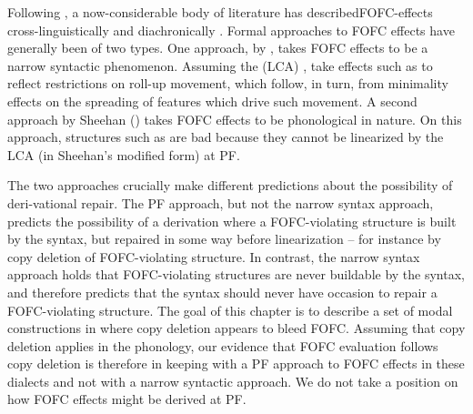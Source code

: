 \documentclass[output=paper]{langscibook}
\begin{document}
Following \cite{Holmberg2000deriving}, a now-considerable body of literature has described\linebreak FOFC-effects cross-linguistically \citep{Holmberg2000deriving,BiberauerEtAl2008,biberaueretal2014,Sheehan2013fofc,sheehan2013some} and diachronically \citep{biberaueretal2009, biberaueretal2010}. Formal approaches to FOFC effects have generally been of two types.\footnotemark\protect{}  One approach, by \cite{biberaueretal2014}, takes FOFC effects to be a narrow syntactic phenomenon.  Assuming the  (LCA) \citep{Kayne1994}, \cite{biberaueretal2014} take effects such as  to reflect restrictions on roll-up movement, which follow, in turn, from minimality effects on the spreading of features which drive such movement.  A second approach by Sheehan (\citeyear{Sheehan2013fofc, sheehan2013some, sheehan2012fofchff}) takes FOFC effects to be phonological in nature.  On this approach, structures such as  are bad because they cannot be linearized by the LCA (in Sheehan's modified form) at PF.  

The two approaches crucially make different predictions about the possibility of deri-\linebreak vational repair. The PF approach, but not the narrow syntax approach, predicts the possibility of a derivation where a FOFC-violating structure is built by the syntax, but repaired in some way before linearization -- for instance by copy deletion of FOFC-violating structure.  In contrast, the narrow syntax approach holds that FOFC-violating structures are never buildable by the syntax, and therefore predicts that the syntax should never have occasion to repair a FOFC-violating structure.  The goal of this chapter is to describe a set of modal constructions in  where copy deletion appears to bleed FOFC.  Assuming that copy deletion applies in the phonology, our evidence that FOFC evaluation follows copy deletion is therefore in keeping with a PF approach to FOFC effects in these dialects and not with a narrow syntactic approach. We do not take a position on how FOFC effects might be derived at PF.
\end{document}
